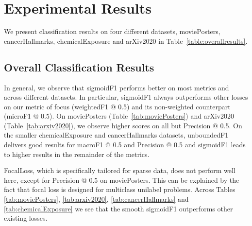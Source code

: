 
\section{Experimental Results}
\label{sec:orgc23a664}

We present classification results on four different datasets, movie\-Posters, cancerHallmarks, chemicalExposure and arXiv2020 in Table~\ref{table:overallresults}. 

\subsection{Overall Classification Results}

In general, we observe that sigmoidF1 performs better on most metrics and across different datasets. In particular, sigmoidF1 always outperforms other losses on our metric of focus (weightedF1 @ 0.5) and its non-weighted counterpart (microF1 @ 0.5). On moviePosters (Table~\ref{tab:moviePosters}) and arXiv2020 (Table~\ref{tab:arxiv2020}), we observe higher scores on all but Precision @ 0.5. On the smaller chemicalExposure and cancerHallmarks datasets, unboundedF1 delivers good results for macroF1 @ 0.5 and Precision @ 0.5 and sigmoidF1 leads to higher results in the remainder of the metrics.



FocalLoss, which is specifically tailored for sparse data, does not perform well here, except for Precision @ 0.5 on moviePosters. This can be explained by the fact that focal loss is designed for multiclass unilabel problems. Across Tables \ref{tab:moviePosters}, \ref{tab:arxiv2020}, \ref{tab:cancerHallmarks} and \ref{tab:chemicalExposure} we see that the smooth sigmoidF1 outperforms other existing losses.

